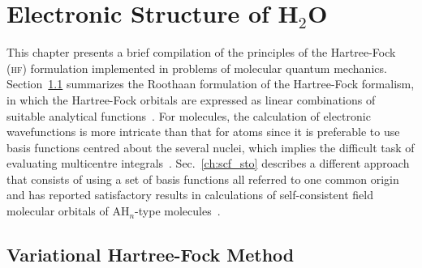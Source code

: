 \chapter{Electronic Structure of H$_{2}$O}
\label{cha:scf_h2o}





This chapter presents a brief compilation of the principles of the
Hartree-Fock (\textsc{hf}) formulation implemented in problems of
molecular quantum mechanics. Section~\ref{ch:var_hf} summarizes the
Roothaan formulation of the Hartree-Fock formalism, in which the
Hartree-Fock orbitals are expressed as linear combinations of suitable
analytical functions~\cite{Roothaan_HF}. For molecules, the
calculation of electronic wavefunctions is more intricate than that
for atoms since it is preferable to use basis functions centred about
the several nuclei, which implies the difficult task of evaluating
multicentre
integrals~\cite{Pitzer_1968,Pitzer_1970}. Sec.~\ref{ch:scf_sto}
describes a different approach that consists of using a set of basis
functions all referred to one common origin and has reported
satisfactory results in calculations of self-consistent field
molecular orbitals of AH$_{n}$-type molecules~\cite{Moccia_JCP_2164,
  Moccia_1964}.


\section{Variational Hartree-Fock Method}
\label{ch:var_hf}






